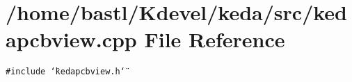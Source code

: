 \section{/home/bastl/Kdevel/keda/src/kedapcbview.cpp File Reference}
\label{kedapcbview_8cpp}
{\tt \#include \char`\"{}kedapcbview.h\char`\"{}}\par
